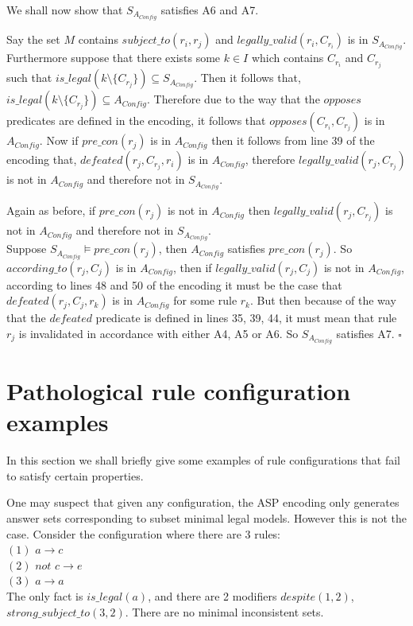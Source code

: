 We shall now show that $S_{A_{Config}}$ satisfies A6 and A7.

Say the set $M$ contains $subject\_to(r_{i}, r_{j})$ and $legally\_valid(r_{i}, C_{r_{i}})$ is in $S_{A_{Config}}$. Furthermore suppose that there exists some $k\in I$ which contains $C_{r_{i}}$ and $C_{r_{j}}$ such that $is\_legal(k\setminus \{C_{r_{j}}\})\subseteq S_{A_{Config}}$. Then it follows that, $is\_legal(k\setminus \{C_{r_{j}}\})\subseteq A_{Config}$. Therefore due to the way that the $opposes$ predicates are defined in the encoding, it follows that $opposes(C_{r_{i}}, C_{r_{j}})$ is in $A_{Config}$. Now if $pre\_con(r_{j})$ is in $A_{Config}$ then it follows from line 39 of the encoding that, $defeated(r_{j}, C_{r_{j}}, r_{i}) $ is in $A_{Config}$, therefore $legally\_valid(r_{j}, C_{r_{j}})$ is not in $A_{Config}$ and therefore not in $S_{A_{Config}}$.

Again as before, if $pre\_con(r_{j})$ is not in $A_{Config}$ then $legally\_valid(r_{j}, C_{r_{j}})$ is not in $A_{Config}$ and therefore not in $S_{A_{Config}}$.\\

Suppose $S_{A_{Config}}\models pre\_con(r_{j})$, then $A_{Config}$ satisfies $pre\_con(r_{j})$. So $according\_to(r_{j},C_{j})$ is in $A_{Config}$, then if $legally\_valid(r_{j}, C_{j})$ is not in $A_{Config}$, according to lines 48 and 50 of the encoding it must be the case that $defeated(r_{j},C_{j},r_{k})$ is in $A_{Config}$ for some rule $r_{k}$. But then because of the way that the $defeated$ predicate is defined in lines 35, 39, 44, it must mean that rule $r_{j}$ is invalidated in accordance with either A4, A5 or A6. So $S_{A_{Config}}$ satisfies A7. $\square$
\section{Pathological rule configuration examples}
In this section we shall briefly give some examples of rule configurations that fail to satisfy certain properties.

One may suspect that given any configuration, the ASP encoding only generates answer sets corresponding to subset minimal legal models. However this is not the case. Consider the configuration where there are 3 rules:\\ $(1)$ $a\rightarrow c$\\
$(2)$ $not$ $c\rightarrow e$\\
$(3)$ $a\rightarrow a$\\
The only fact is $is\_legal(a)$, and there are 2 modifiers $despite(1,2)$, $strong\_subject\_to(3,2)$. There are no minimal inconsistent sets.

